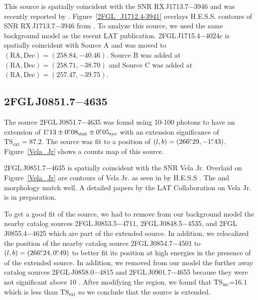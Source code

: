 \documentclass[12pt,preprint]{aastex}
\newcommand{\gev}{\text{GeV}\xspace}
\newcommand{\tev}{\text{TeV}\xspace}
\newcommand{\tsext}{{\ensuremath{\text{TS}_{\text{ext}}}}\xspace}
\newcommand{\tsinc}{\ensuremath{\text{TS}_{\text{inc}}}\xspace}
\newcommand{\sys}{\text{sys}\xspace}
\newcommand{\stat}{\text{stat}\xspace}
\begin{document}
This source is spatially coincident with the SNR RX\,J1713.7$-$3946
and was recently reported by \citep{rx_j1713_lat}.  
Figure~\ref{2FGL_J1712.4-3941} overlays H.E.S.S. \tev contours of SNR 
RX\,J1713.7$-$3946 from \citep{rx_j1713_hess}.  To analyze this source,
we used the same background model as the recent LAT publication.
2FGL\,J1715.4$-$4024c is spatially coincident with Source A and was
moved to $(\text{RA},\text{Dec})=(258.84,-40.46)$. Source B was added
at $(\text{RA},\text{Dec})=(258.71,-38.70)$ and Source C was added at
$(\text{RA},\text{Dec})=(257.47,-39.75)$.

\subsection{2FGL\,J0851.7$-$4635}
\label{section_2FGL_J0851.7-4635}


The source 2FGL\,J0851.7$-$4635 was found 
using 10-100 \gev photons to have an
extension of $1\fdg13\pm0\fdg08_\stat\pm0\fdg05_\sys$ 
with an extension
significance of $\tsext=87.2$.  The source was fit to a position of
$(l,b)=(266\mbox{$.\!\!^\circ$}29,-1\mbox{$.\!\!^\circ$}43)$.  Figure~\ref{Vela_Jr} shows a counts
map of this source.

2FGL\,J0851.7$-$4635 is spatially coincident with the SNR Vela Jr.
Overlaid on Figure~\ref{Vela_Jr} are contours of Vela Jr. as seen in
\tev by H.E.S.S \citep{vela_jr_hess}.  The \gev and \tev morphology
match well.  A detailed papers by the LAT Collaboration on Vela Jr. is
in preparation.

To get a good fit of the source, we had to remove from
our background model the nearby catalog
sources 2FGL\,J0853.5$-$4711, 2FGL\,J0848.5$-$4535, and 2FGL\,J0855.4$-$4625
which are part of the extended source.  In addition, we relocalized
the position of the nearby catalog source 2FGL\,J0854.7$-$4501 to
$(l,b)=(266\mbox{$.\!\!^\circ$}24,0\mbox{$.\!\!^\circ$}49)$ to better fit its position at high energies
in the presence of of the extended source.  In addition, we removed from
our model the
further away catalog sources 2FGL\,J0858.0$-$4815 and 2FGL\,J0901.7$-$4655
because they were not significant above 10 \gev.  After modifying
the region, we found that \tsinc=16.1 which is less than \tsext so we
conclude that the source is extended. 
\end{document}
